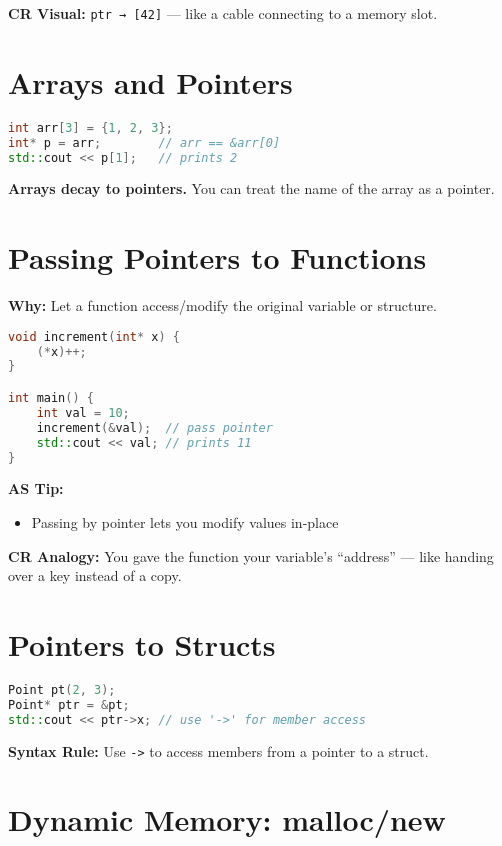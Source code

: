 \documentclass{article}
\begin{document}
\textbf{CR Visual:} \texttt{ptr → [42]} — like a cable connecting to a memory slot.

\section*{Arrays and Pointers}

\begin{lstlisting}[language=C++]
int arr[3] = {1, 2, 3};
int* p = arr;        // arr == &arr[0]
std::cout << p[1];   // prints 2
\end{lstlisting}

\textbf{Arrays decay to pointers.} You can treat the name of the array as a pointer.

\section*{Passing Pointers to Functions}

\textbf{Why:} Let a function access/modify the original variable or structure.

\begin{lstlisting}[language=C++]
void increment(int* x) {
    (*x)++;
}

int main() {
    int val = 10;
    increment(&val);  // pass pointer
    std::cout << val; // prints 11
}
\end{lstlisting}

\textbf{AS Tip:}
\begin{itemize}
    \item Passing by pointer lets you modify values in-place
\end{itemize}

\textbf{CR Analogy:} You gave the function your variable’s “address” — like handing over a key instead of a copy.

\section*{Pointers to Structs}

\begin{lstlisting}[language=C++]
Point pt(2, 3);
Point* ptr = &pt;
std::cout << ptr->x; // use '->' for member access
\end{lstlisting}

\textbf{Syntax Rule:} Use \texttt{->} to access members from a pointer to a struct.

\section*{Dynamic Memory: malloc/new}
\end{document}
